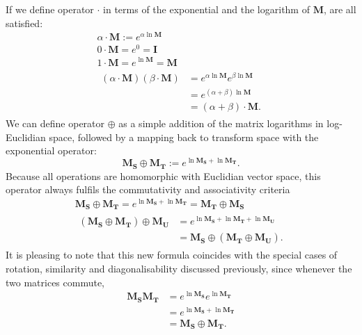         If we define operator $\cdot$ in terms of the exponential and the logarithm of $\mathbf{M}$,  are all satisfied:
        \begin{gather}
          \alpha \cdot \mathbf{M} := e^{\alpha\ln\mathbf{M}} \\
          0 \cdot \mathbf{M} = e^0 = \mathbf{I} \\
          1 \cdot \mathbf{M} = e^{\ln\mathbf{M}} = \mathbf{M} \\
          \begin{split}
            (\alpha \cdot \mathbf{M})(\beta \cdot \mathbf{M}) &= e^{\alpha\ln\mathbf{M}}e^{\beta\ln\mathbf{M}} \\
                                                              &= e^{(\alpha + \beta)\ln\mathbf{M}} \\
                                                              &= (\alpha + \beta) \cdot \mathbf{M}.
          \end{split}
        \end{gather}
        We can define operator $\oplus$ as a simple addition of the matrix logarithms in log-Euclidian space, followed by a mapping back to transform space with the exponential operator:
        \begin{equation}
          \mathbf{M_S} \oplus \mathbf{M_T} := e^{\ln\mathbf{M_S} + \ln\mathbf{M_T}}.
        \end{equation}
        Because all operations are homomorphic with Euclidian vector space, this operator always fulfils the commutativity and associativity criteria
        \begin{gather}
          \mathbf{M_S} \oplus \mathbf{M_T} = e^{\ln\mathbf{M_S} + \ln\mathbf{M_T}} = \mathbf{M_T} \oplus \mathbf{M_S} \\
          \begin{split}
            (\mathbf{M_S}\oplus\mathbf{M_T})\oplus\mathbf{M_U} &= e^{\ln\mathbf{M_S} + \ln\mathbf{M_T} + \ln\mathbf{M_U}} \\
                                                               &= \mathbf{M_S}\oplus(\mathbf{M_T}\oplus\mathbf{M_U}).
          \end{split}
        \end{gather}
        It is pleasing to note that this new formula coincides with the special cases of rotation, similarity and diagonalisability discussed previously, since whenever the two matrices commute,
        \begin{equation}
            \begin{split}
                \mathbf{M_SM_T} &= e^{\ln\mathbf{M_S}}e^{\ln\mathbf{M_T}} \\
                                &= e^{\ln\mathbf{M_S} + \ln\mathbf{M_T}} \\
                                &= \mathbf{M_S} \oplus \mathbf{M_T}.
            \end{split}
        \end{equation}
